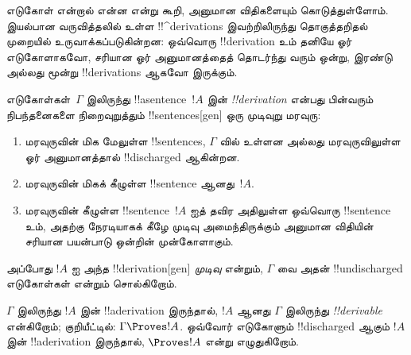 \documentclass[../../../include/open-logic-section]{subfiles}
\begin{document}
      {}
      {}


\begin{explain}
எடுகோள் என்றால் என்ன என்று கூறி, அனுமான விதிகளையும் கொடுத்துள்ளோம். இயல்பான
வருவித்தலில் உள்ள !!^{derivation}s இவற்றிலிருந்து தொகுத்தறிதல் முறையில்
உருவாக்கப்படுகின்றன: ஒவ்வொரு !!{derivation} உம் தனியே ஓர் எடுகோளாகவோ,
சரியான ஓர் அனுமானத்தைத் தொடர்ந்து வரும் ஒன்று, இரண்டு அல்லது மூன்று
!!{derivation}s ஆகவோ இருக்கும்.
\end{explain}

\begin{defn}[!!^{derivation}]
எடுகோள்கள்~$\Gamma$ இலிருந்து !!a{sentence}~$!A$ இன்
 \emph{!!{derivation}} என்பது பின்வரும் நிபந்தனைகளை
நிறைவுறுத்தும் !!{sentence}s[gen] ஒரு முடிவுறு மரவுரு:
\begin{enumerate}
\item மரவுருவின் மிக மேலுள்ள !!{sentence}s, $\Gamma$ வில் உள்ளன அல்லது
  மரவுருவிலுள்ள ஓர் அனுமானத்தால் !!{discharged} ஆகின்றன.
\item மரவுருவின் மிகக் கீழுள்ள !!{sentence} ஆனது~$!A$.
\item மரவுருவின் கீழுள்ள !!{sentence}~$!A$ ஐத் தவிர அதிலுள்ள ஒவ்வொரு
  !!{sentence} உம், அதற்கு நேரடியாகக் கீழே முடிவு அமைந்திருக்கும் அனுமான
  விதியின் சரியான பயன்பாடு ஒன்றின் முன்கோளாகும்.
\end{enumerate}
அப்போது $!A$ ஐ அந்த !!{derivation}[gen] \emph{முடிவு} என்றும், $\Gamma$ வை
அதன் !!{undischarged} எடுகோள்கள் என்றும் சொல்கிறோம்.

$\Gamma$ இலிருந்து $!A$ இன் !!a{derivation} இருந்தால், $!A$ ஆனது
$\Gamma$ இலிருந்து \emph{!!{derivable}} என்கிறோம்; குறியீட்டில்:
$\Gamma \Proves !A$. ஒவ்வோர் எடுகோளும் !!{discharged} ஆகும் $!A$ இன்
!!a{derivation} இருந்தால், $\Proves !A$ என்று எழுதுகிறோம்.
\end{defn}
\end{document}
